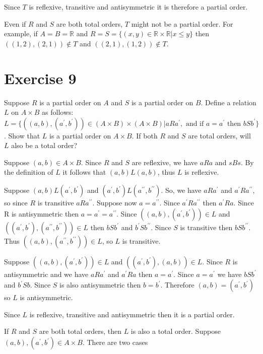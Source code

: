 \documentclass[11pt]{article}
\newcommand{\dprime}{{\prime \prime}}
\begin{document}
Since $T$ is reflexive, transitive and antisymmetric it is therefore a partial order.

Even if $R$ and $S$ are both total orders, $T$ might not be a partial order.
For example, if $A = B = \mathbb{R}$ and 
$R = S = \{(x,y) \in \mathbb{R} \times \mathbb{R} | x \leq y \}$ then 
$((1,2), (2,1)) \notin T$ and $((2,1),(1,2)) \notin T$.

\section*{Exercise 9}

Suppose $R$ is a partial order on $A$ and $S$ is a partial order on $B$.
Define a relation $L$ on $A \times B$ as follows: 
$L = \{((a, b), (a^\prime, b^\prime)) \in (A \times B) \times (A \times B) | aRa^\prime, \text{ and if } a=a^\prime \text{ then } bSb^\prime \}$.
Show that $L$ is a partial order on $A \times B$. If both $R$ and $S$ are 
total orders, will $L$ also be a total order?

Suppose $(a, b) \in A \times B$. Since $R$ and $S$ are reflexive, we have 
$aRa$ and $sBs$. By the definition of $L$ it follows that 
$(a, b)L(a,b)$, thus $L$ is reflexive.

Suppose $(a,b)L(a^\prime, b^\prime)$ and 
$(a^\prime, b^\prime)L(a^\dprime, b^\dprime)$. So, we have $aRa^\prime$ and 
$a^\prime R a^\dprime$, so since $R$ is transitive $a R a^\dprime$. Suppose now 
$a = a^\dprime$. Since $a^\prime R a^\dprime$ then $a^\prime R a$. Since R is 
antisymmetric then $a = a^\prime = a^\dprime$. Since 
$((a,b), (a^\prime, b^\prime)) \in L$ and 
$((a^\prime, b^\prime), (a^\dprime, b^\dprime)) \in L$ then $bSb^\prime$ and 
$b^\prime S b^\dprime$. Since $S$ is transitive then $bSb^\dprime$. 
Thus $((a,b), (a^\dprime, b^\dprime)) \in L$, so $L$ is transitive.

Suppose $((a, b), (a^\prime, b^\prime)) \in L$ and 
$((a^\prime, b^\prime), (a,b)) \in L$. Since $R$ is antisymmetric and we have 
$aRa^\prime$ and $a^\prime Ra$ then $a = a^\prime$. Since $a = a^\prime$ we have
$bSb^\prime$ and $b^\prime Sb$. Since $S$ is also antisymmetric then 
$b = b^\prime$. Therefore $(a, b) = (a^\prime, b^\prime)$ so $L$ is antisymmetric.

Since $L$ is reflexive, transitive and antisymmetric then it is a partial order.

If $R$ and $S$ are both total orders, then $L$ is also a total order. Suppose 
$(a,b), (a^\prime, b^\prime) \in A \times B$. There are two cases 
\end{document}
